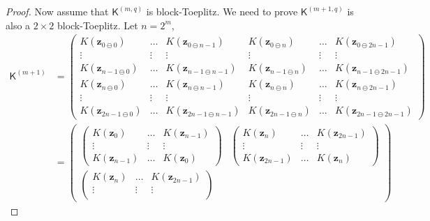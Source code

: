 \documentclass{svjour3}                     %
\newcommand{\bm}[1]{\boldsymbol{#1}}
\newcommand{\naturals}{\mathbb{N}}
\newcommand{\vz}{\bm{z}}
\newcommand{\mK}{\mathsf{K}}
\begin{document}
\begin{proof}
	Now assume that $\mK^{(m,q)}$ is block-Toeplitz.
	We need to prove $\mK^{(m+1, q)}$ is also a $2\times 2$ block-Toeplitz. Let $n=2^m$,
	\begin{align*}
	\mK^{(m+1)} &= 
	\begin{pmatrix}
	K(\vz_{0    \ominus 0}) & \hdots & K(\vz_{0    \ominus n-1}) & K(\vz_{0    \ominus n}) & \hdots & K(\vz_{0    \ominus 2n-1}) \\
	\vdots             & \vdots &             \vdots          &           \vdots      & \vdots &             \vdots         \\
	K(\vz_{n-1  \ominus 0}) & \hdots & K(\vz_{n-1  \ominus n-1}) & K(\vz_{n-1  \ominus n}) & \hdots & K(\vz_{n-1  \ominus 2n-1}) \\
	K(\vz_{n    \ominus 0}) & \hdots & K(\vz_{n    \ominus n-1}) & K(\vz_{n    \ominus n}) & \hdots & K(\vz_{n    \ominus 2n-1}) \\
	\vdots      & \vdots &             \vdots        &             \vdots      & \vdots &             \vdots         \\
	K(\vz_{2n-1 \ominus 0}) & \hdots & K(\vz_{2n-1 \ominus n-1}) & K(\vz_{2n-1 \ominus n}) & \hdots & K(\vz_{2n-1 \ominus 2n-1}) 
	\end{pmatrix} 
	\\
	& = 
	\begin{pmatrix}
	\begin{pmatrix}
	K(\vz_{  0   }) & \hdots & K(\vz_{ n-1}) \\
	\vdots          & \vdots &    \vdots     \\
	K(\vz_{ n-1  }) & \hdots & K(\vz_{ 0 })
	\end{pmatrix}
	& 
	\begin{pmatrix}
	K(\vz_{ n})     & \hdots & K(\vz_{ 2n-1}) \\
	\vdots          & \vdots &     \vdots     \\
	K(\vz_{ 2n-1 }) & \hdots & K(\vz_{ n })   
	\end{pmatrix}
	\\
	\begin{pmatrix}
	K(\vz_{ n})     & \hdots & K(\vz_{ 2n-1}) \\
	\vdots          & \vdots &     \vdots     \\

\end{pmatrix}
\end{pmatrix}
\end{align*}
\end{proof}
\end{document}
